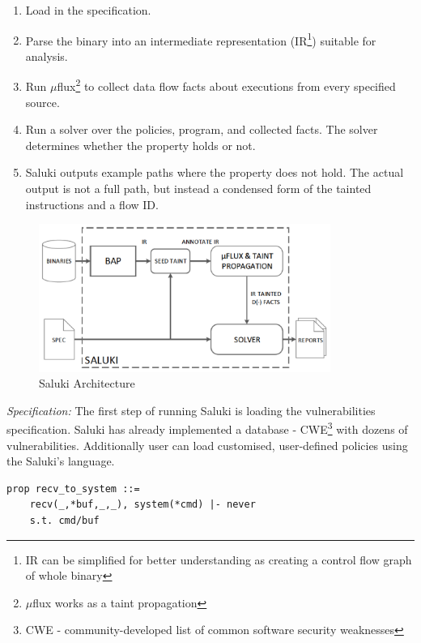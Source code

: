 \documentclass[a4paper, 12pt, journal, onecolumn]{IEEEtran}
\begin{document}
\begin{enumerate}[label=\Alph*]
\item Load in the specification.
\item Parse the binary into an intermediate representation (IR\footnote{IR can be simplified for better understanding as creating a control flow graph of whole binary}) suitable for analysis. 
\item Run $\mu$flux\footnote{$\mu$flux works as a taint propagation} to collect data flow facts about executions from every specified source.
\item Run a solver over the policies, program, and collected facts. The solver determines whether the property holds or not.
\item Saluki outputs example paths where the property does not hold. The actual output is not a full path, but instead a condensed form of the tainted instructions and a flow ID.
\end{enumerate}

\begin{figure}[ht]
    \centering
    \captionsetup{justification=centering}
    \includegraphics[width=0.85\textwidth]{saluki.png}
    \caption{Saluki Architecture \cite{saluki}}
    \label{fig:saluki}
\end{figure}

\textit{Specification: } The first step of running Saluki is loading the vulnerabilities specification. Saluki has already implemented a database - CWE\footnote{CWE - community-developed list of common software security weaknesses} with dozens of vulnerabilities. Additionally user can load customised, user-defined policies using the Saluki's language.\\


\begin{lstlisting}[label=saluki-code,caption=Command injection example]
    prop recv_to_system ::=
    recv(_,*buf,_,_), system(*cmd) |- never
    s.t. cmd/buf
\end{lstlisting}
\end{document}
